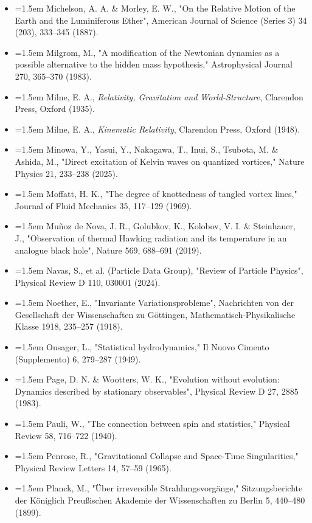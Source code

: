 \documentclass[11pt,a4paper]{article}
\begin{document}
\begin{itemize}[leftmargin=1.5em,label={}]
\item \hangindent=1.5em Michelson, A. A. \& Morley, E. W., "On the Relative Motion of the Earth and the Luminiferous Ether", American Journal of Science (Series 3) 34 (203), 333–345 (1887).
\item \hangindent=1.5em Milgrom, M., "A modification of the Newtonian dynamics as a possible alternative to the hidden mass hypothesis," Astrophysical Journal 270, 365–370 (1983).
\item \hangindent=1.5em Milne, E. A., \emph{Relativity, Gravitation and World-Structure}, Clarendon Press, Oxford (1935).
\item \hangindent=1.5em Milne, E. A., \emph{Kinematic Relativity}, Clarendon Press, Oxford (1948).
\item \hangindent=1.5em Minowa, Y., Yasui, Y., Nakagawa, T., Inui, S., Tsubota, M. \& Ashida, M., "Direct excitation of Kelvin waves on quantized vortices," Nature Physics 21, 233–238 (2025).
\item \hangindent=1.5em Moffatt, H. K., "The degree of knottedness of tangled vortex lines," Journal of Fluid Mechanics 35, 117–129 (1969).
\item \hangindent=1.5em Muñoz de Nova, J. R., Golubkov, K., Kolobov, V. I. \& Steinhauer, J., "Observation of thermal Hawking radiation and its temperature in an analogue black hole", Nature 569, 688–691 (2019).
\item \hangindent=1.5em Navas, S., et al. (Particle Data Group), "Review of Particle Physics", Physical Review D 110, 030001 (2024).
\item \hangindent=1.5em Noether, E., "Invariante Variationsprobleme", Nachrichten von der Gesellschaft der Wissenschaften zu Göttingen, Mathematisch-Physikalische Klasse 1918, 235–257 (1918).
\item \hangindent=1.5em Onsager, L., "Statistical hydrodynamics," Il Nuovo Cimento (Supplemento) 6, 279–287 (1949).
\item \hangindent=1.5em Page, D. N. \& Wootters, W. K., "Evolution without evolution: Dynamics described by stationary observables", Physical Review D 27, 2885 (1983).
\item \hangindent=1.5em Pauli, W., "The connection between spin and statistics," Physical Review 58, 716–722 (1940).
\item \hangindent=1.5em Penrose, R., "Gravitational Collapse and Space-Time Singularities," Physical Review Letters 14, 57–59 (1965).
\item \hangindent=1.5em Planck, M., "Über irreversible Strahlungsvorgänge," Sitzungsberichte der Königlich Preußischen Akademie der Wissenschaften zu Berlin 5, 440–480 (1899).

\end{itemize}
\end{document}
